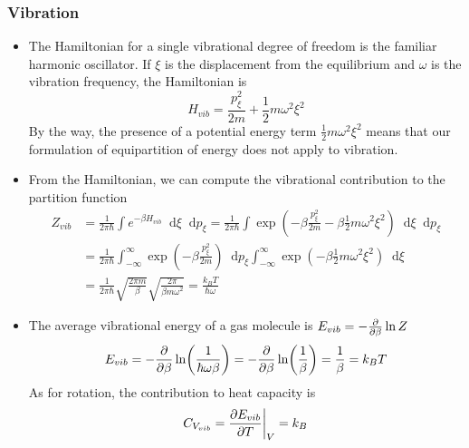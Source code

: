 \documentclass[11pt, a4paper]{article}
\newcommand{\diff}{\mathop{}\!\mathrm{d}} %
\begin{document}
\subsubsection{Vibration}
\begin{itemize}
	\item The Hamiltonian for a single vibrational degree of freedom is the familiar harmonic oscillator. If $ \xi $ is the displacement from the equilibrium and $ \omega $ is the vibration frequency, the Hamiltonian is		
	\begin{equation*}
		H_{vib} = \frac{p_{\xi}^{2}}{2m} + \frac{1}{2} m \omega^{2}\xi^{2}
	\end{equation*}
	By the way, the presence of a potential energy term $ \frac{1}{2} m \omega^{2}\xi^{2} $ means that our formulation of equipartition of energy does not apply to vibration. 
	
	\item From the Hamiltonian, we can compute the vibrational contribution to the partition function
	\begin{align*}
		Z_{vib} &= \frac{1}{2\pi \hbar} \int e^{-\beta H_{vib}} \diff \xi \diff p_{\xi} = \frac{1}{2\pi \hbar} \int \exp(-\beta \frac{p_{\xi}^{2}}{2m} -\beta  \frac{1}{2} m \omega^{2}\xi^{2}) \diff \xi \diff p_{\xi}\\
		&=\frac{1}{2\pi \hbar} \int_{-\infty}^{\infty} \exp(-\beta \frac{p_{\xi}^{2}}{2m})\diff p_{\xi} \int_{-\infty}^{\infty}\exp(-\beta  \frac{1}{2} m \omega^{2}\xi^{2}) \diff \xi \\
		&=\frac{1}{2\pi \hbar} \sqrt{\frac{2\pi m}{\beta}} \sqrt{\frac{2\pi}{\beta m \omega^{2}}} = \frac{k_{B}T}{\hbar \omega}
	\end{align*}
	
	\item The average vibrational energy of a gas molecule is $ E_{vib} = -\pdv{}{\beta} \ln Z  $
	\begin{equation*}
		E_{vib} = -\pdv{}{\beta} \ln(\frac{1}{\hbar \omega \beta}) = -\pdv{}{\beta} \ln(\frac{1}{\beta}) = \frac{1}{\beta} = k_{B}T
	\end{equation*}
	As for rotation, the contribution to heat capacity is
	\begin{equation*}
		C_{V_{vib}} = \pdv{E_{vib}}{T} \bigg |_{V} = k_{B}
	\end{equation*}
\end{itemize}
\end{document}
